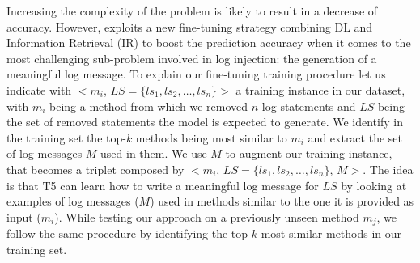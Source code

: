 Increasing the complexity of the problem is likely to result in a decrease of accuracy. However, \approach exploits a new fine-tuning strategy combining DL and Information Retrieval (IR) to boost the prediction accuracy when it comes to the most challenging sub-problem involved in log injection: the generation of a meaningful log message. To explain our fine-tuning training procedure let us indicate with $<$$m_i$, $LS=\{ls_1, ls_2, \dots, ls_n\}$$>$ a training instance in our dataset, with $m_i$ being a \java method from which we removed $n$ log statements and $LS$ being the set of removed statements the model is expected to generate. We identify in the training set the top-$k$ methods being most similar to $m_i$ and extract the set of log messages $M$ used in them. We use $M$ to augment our training instance, that becomes a triplet composed by $<$$m_i$, $LS=\{ls_1, ls_2, \dots, ls_n\}$, $M$$>$. The idea is that T5 can learn how to write a meaningful log message for $LS$ by looking at examples of log messages ($M$) used in methods similar to the one it is provided as input ($m_i$). While testing our approach on a previously unseen method $m_j$, we follow the same procedure by identifying the top-$k$ most similar methods in our training set.